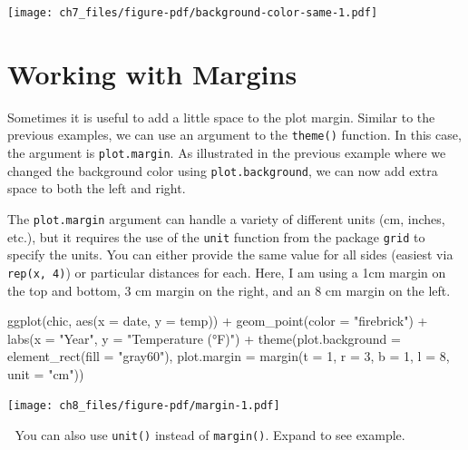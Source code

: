 \documentclass[
  letterpaper,
  DIV=11,
  numbers=noendperiod]{scrreprt}
\newenvironment{Shaded}{\begin{snugshade}}{\end{snugshade}}
\newcommand{\AttributeTok}[1]{\textcolor[rgb]{0.40,0.45,0.13}{#1}}
\newcommand{\DecValTok}[1]{\textcolor[rgb]{0.68,0.00,0.00}{#1}}
\newcommand{\FunctionTok}[1]{\textcolor[rgb]{0.28,0.35,0.67}{#1}}
\newcommand{\NormalTok}[1]{\textcolor[rgb]{0.00,0.23,0.31}{#1}}
\newcommand{\SpecialCharTok}[1]{\textcolor[rgb]{0.37,0.37,0.37}{#1}}
\newcommand{\StringTok}[1]{\textcolor[rgb]{0.13,0.47,0.30}{#1}}
\begin{document}
\texttt{[image: ch7\_files/figure-pdf/background-color-same-1.pdf]}


\chapter{Working with Margins}\label{margins}

Sometimes it is useful to add a little space to the plot margin. Similar
to the previous examples, we can use an argument to the \texttt{theme()}
function. In this case, the argument is \texttt{plot.margin}. As
illustrated in the previous example where we changed the background
color using \texttt{plot.background}, we can now add extra space to both
the left and right.

The \texttt{plot.margin} argument can handle a variety of different
units (cm, inches, etc.), but it requires the use of the \texttt{unit}
function from the package \texttt{grid} to specify the units. You can
either provide the same value for all sides (easiest via
\texttt{rep(x,\ 4)}) or particular distances for each. Here, I am using
a 1cm margin on the top and bottom, 3 cm margin on the right, and an 8
cm margin on the left.

\begin{Shaded}
\begin{Highlighting}[]
\FunctionTok{ggplot}\NormalTok{(chic, }\FunctionTok{aes}\NormalTok{(}\AttributeTok{x =}\NormalTok{ date, }\AttributeTok{y =}\NormalTok{ temp)) }\SpecialCharTok{+}
  \FunctionTok{geom\_point}\NormalTok{(}\AttributeTok{color =} \StringTok{"firebrick"}\NormalTok{) }\SpecialCharTok{+}
  \FunctionTok{labs}\NormalTok{(}\AttributeTok{x =} \StringTok{"Year"}\NormalTok{, }\AttributeTok{y =} \StringTok{"Temperature (°F)"}\NormalTok{) }\SpecialCharTok{+}
  \FunctionTok{theme}\NormalTok{(}\AttributeTok{plot.background =} \FunctionTok{element\_rect}\NormalTok{(}\AttributeTok{fill =} \StringTok{"gray60"}\NormalTok{),}
        \AttributeTok{plot.margin =} \FunctionTok{margin}\NormalTok{(}\AttributeTok{t =} \DecValTok{1}\NormalTok{, }\AttributeTok{r =} \DecValTok{3}\NormalTok{, }\AttributeTok{b =} \DecValTok{1}\NormalTok{, }\AttributeTok{l =} \DecValTok{8}\NormalTok{, }\AttributeTok{unit =} \StringTok{"cm"}\NormalTok{))}
\end{Highlighting}
\end{Shaded}

\texttt{[image: ch8\_files/figure-pdf/margin-1.pdf]}

💁 You can also use \texttt{unit()} instead of \texttt{margin()}. Expand
to see example.
\end{document}
